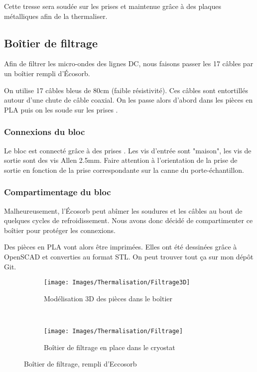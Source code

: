 Cette tresse sera soudée sur les prises \uD et maintenue grâce à des plaques métalliques afin de la thermaliser.

\subsection{Boîtier de filtrage}
Afin de filtrer les micro-ondes des lignes DC, nous faisons passer les 17 câbles par un boîtier rempli d'Écosorb.

On utilise 17 câbles bleus de 80cm (faible résistivité). Ces câbles sont entortillés autour d'une chute de câble coaxial. On les passe alors d'abord dans les pièces en PLA puis on les soude sur les prises \uD.

\subsubsection{Connexions du bloc}
Le bloc est connecté grâce à des prises \uD. Les vis d'entrée sont "maison", les vis de sortie sont des vis Allen 2.5mm. Faire attention à l'orientation de la prise de sortie en fonction de la prise correspondante sur la canne du porte-échantillon.

\subsubsection{Compartimentage du bloc}
Malheureusement, l'Écosorb peut abîmer les soudures et les câbles au bout de quelques cycles de refroidissement. Nous avons donc décidé de compartimenter ce boîtier pour protéger les connexions.

Des pièces en PLA vont alors être imprimées. Elles ont été dessinées grâce à OpenSCAD et converties au format STL. On peut trouver tout ça sur mon dépôt Git.

\begin{figure*}[t!]
    \centering
    \begin{subfigure}[t]{0.59\textwidth}
        \centering
        \texttt{[image: Images/Thermalisation/Filtrage3D]}
        \caption{Modélisation 3D des pièces dans le boîtier}
    \end{subfigure}%
    ~ 
    \begin{subfigure}[t]{0.39\textwidth}
        \centering
        \texttt{[image: Images/Thermalisation/Filtrage]}
        \caption{Boîtier de filtrage en place dans le cryostat}
    \end{subfigure}
    \caption{Boîtier de filtrage, rempli d'Eccosorb}
\end{figure*}

